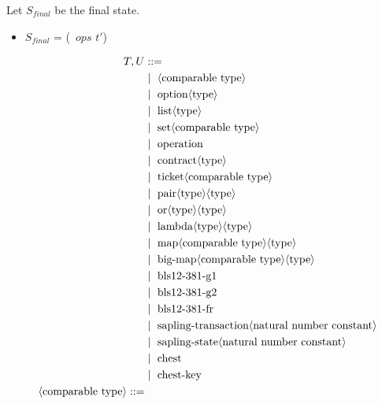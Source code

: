 \documentclass[runningheads]{llncs}
\begin{document}
\noindent Let $S_{final}$  be the final state. 

\begin{itemize}
\item[]  $S_{final}$ = (\PAIR\ $ops$ $t'$) \STACKCONCAT\ \EMPTYSTACK
\end{itemize}





\begin{figure} []
\begin{align*}
T, U &::= \\
   &\Mid\ \langle \text{comparable type}\rangle \\
   &\Mid\ \text{option} \langle\text{type}\rangle \\
   &\Mid\ \text{list} \langle\text{type}\rangle \\
   &\Mid\ \text{set} \langle\text{comparable type}\rangle \\
   &\Mid\ \text{operation} \\
   &\Mid\ \text{contract} \langle\text{type}\rangle \\
   &\Mid\ \text{ticket} \langle\text{comparable type}\rangle \\
   &\Mid\ \text{pair} \langle\text{type}\rangle \langle\text{type}\rangle \\
   &\Mid\ \text{or} \langle\text{type}\rangle \langle\text{type}\rangle \\
   &\Mid\ \text{lambda} \langle\text{type}\rangle \langle\text{type}\rangle \\
   &\Mid\ \text{map} \langle\text{comparable type}\rangle \langle\text{type}\rangle \\
   &\Mid\ \text{big-map} \langle\text{comparable type}\rangle \langle\text{type}\rangle \\
   &\Mid\ \text{bls12-381-g1} \\
   &\Mid\ \text{bls12-381-g2} \\
   &\Mid\ \text{bls12-381-fr} \\
   &\Mid\ \text{sapling-transaction} \langle\text{natural number constant}\rangle \\
   &\Mid\ \text{sapling-state} \langle\text{natural number constant}\rangle \\
   &\Mid\ \text{chest} \\
   &\Mid\ \text{chest-key} \\
\langle\text{comparable type}\rangle ::= \\

\end{align*}
\end{figure}
\end{document}
